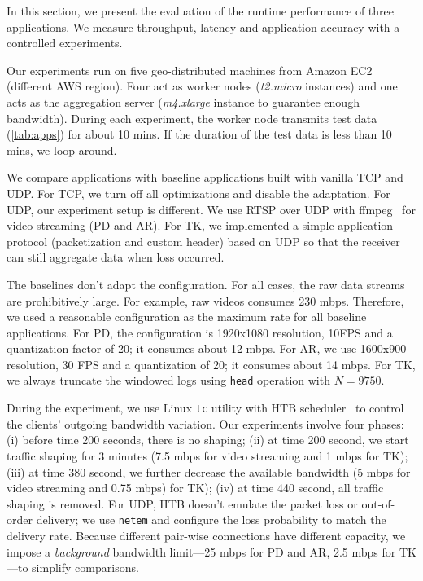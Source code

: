 
In this section, we present the evaluation of the runtime performance of three
applications. We measure throughput, latency and application accuracy with a
controlled experiments.

Our experiments run on five geo-distributed machines from Amazon EC2 (different
AWS region). Four act as worker nodes (\textit{t2.micro} instances) and one acts
as the aggregation server (\textit{m4.xlarge} instance to guarantee enough
bandwidth). During each experiment, the worker node transmits test data
(\autoref{tab:apps}) for about 10 mins. If the duration of the test data is less
than 10 mins, we loop around.

We compare \sysname{} applications with baseline applications built with vanilla
TCP and UDP. For TCP, we turn off all optimizations and disable the
adaptation. For UDP, our experiment setup is different. We use RTSP over UDP
with ffmpeg~\cite{bellard2012ffmpeg} for video streaming (PD and AR). For TK, we
implemented a simple application protocol (packetization and custom header)
based on UDP so that the receiver can still aggregate data when loss occurred.

The baselines don't adapt the configuration. For all cases, the raw data streams
are prohibitively large. For example, raw videos consumes 230 mbps. Therefore,
we used a reasonable configuration as the maximum rate for all baseline
applications. For PD, the configuration is 1920x1080 resolution, 10FPS and a
quantization factor of 20; it consumes about 12 mbps. For AR, we use 1600x900
resolution, 30 FPS and a quantization of 20; it consumes about 14 mbps. For TK,
we always truncate the windowed logs using \texttt{head} operation with
$N=9750$.

During the experiment, we use Linux \texttt{tc} utility with HTB
scheduler~\cite{lartc, htb} to control the clients' outgoing bandwidth
variation. Our experiments involve four phases: (i) before time 200 seconds,
there is no shaping; (ii) at time 200 second, we start traffic shaping for 3
minutes (7.5 mbps for video streaming and 1 mbps for TK); (iii) at time 380
second, we further decrease the available bandwidth (5 mbps for video streaming
and 0.75 mbps) for TK); (iv) at time 440 second, all traffic shaping is
removed. For UDP, HTB doesn't emulate the packet loss or out-of-order delivery;
we use \texttt{netem} and configure the loss probability to match the delivery
rate. Because different pair-wise connections have different capacity, we impose
a \textit{background} bandwidth limit---25 mbps for PD and AR, 2.5 mbps for
TK---to simplify comparisons.

